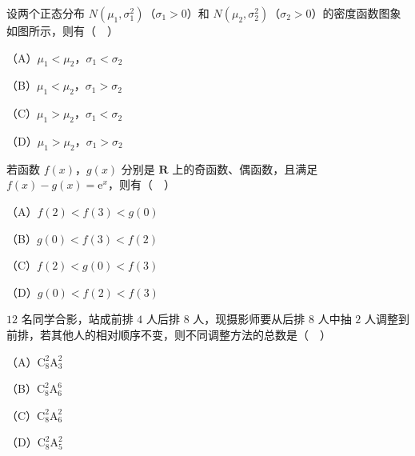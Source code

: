 \endgroup
\begin{question}
设两个正态分布 $N(\mu_1,\sigma_1^2)$（$\sigma_1>0$）和 $N(\mu_2,\sigma_2^2)$（$\sigma_2>0$）的密度函数图象如图所示，则有（　）
\nopagebreak[4]
\begin{center}\end{center}
\nopagebreak[4]
（A）$\mu_1<\mu_2$，$\sigma_1<\sigma_2$

（B）$\mu_1<\mu_2$，$\sigma_1>\sigma_2$

（C）$\mu_1>\mu_2$，$\sigma_1<\sigma_2$

（D）$\mu_1>\mu_2$，$\sigma_1>\sigma_2$

\end{question}
\begin{question}
若函数 $f(x)$，$g(x)$ 分别是 $\mathbf R$ 上的奇函数、偶函数，且满足 $f(x)-g(x)=\mathrm e^x$，则有（　）

（A）$f(2)<f(3)<g(0)$

（B）$g(0)<f(3)<f(2)$

（C）$f(2)<g(0)<f(3)$

（D）$g(0)<f(2)<f(3)$

\end{question}
\begin{question}
$12$ 名同学合影，站成前排 $4$ 人后排 $8$ 人，现摄影师要从后排 $8$ 人中抽 $2$ 人调整到前排，若其他人的相对顺序不变，则不同调整方法的总数是（　）

（A）$\mathrm C_8^2\mathrm A_3^2$

（B）$\mathrm C_8^2\mathrm A_6^6$

（C）$\mathrm C_8^2\mathrm A_6^2$

（D）$\mathrm C_8^2\mathrm A_5^2$

\end{question}

